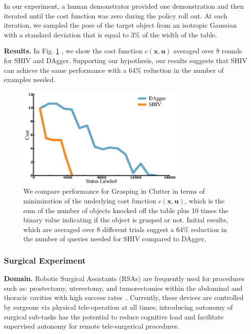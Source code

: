 \documentclass[10pt, conference]{ieeeconf}      %
\newcommand{\bu}{\mathbf{u}}
\newcommand{\bx}{\mathbf{x}}
\begin{document}
In our experiment, a human demonstrator provided one demonstration and then iterated until the cost function was zero during the policy roll out. At each iteration, we sampled the pose of the target object from an isotropic Gaussian with a standard deviation that is equal to $3\%$ of the width of the table. 

\noindent\textbf{Results.} In Fig. \ref{fig:grasp_cost} , we show the cost function $c(\bx,\bu)$ averaged over 8 rounds for SHIV and DAgger. Supporting our hypothesis, our results suggests that SHIV can achieve the same performance with a 64\% reduction in the number of examples needed.

\begin{figure}[t!]
\centering
\includegraphics[width=\columnwidth, height=2in]{figures/grasp_clutter.eps}
\caption{We compare performance for Grasping in Clutter in terms of minimization of the underlying cost function $c(\bx,\bu)$, which is the sum of the number of objects knocked off the table plus 10 times the binary value indicating if the object is grasped or not. Initial results, which are averaged over 8 different trials suggest a $64\%$ reduction in the number of queries needed for SHIV compared to DAgger,}
\vspace*{-10pt}
\label{fig:grasp_cost}
\end{figure}




\subsubsection{Surgical Experiment}

\noindent\textbf{Domain.}
Robotic Surgical Assistants (RSAs) are frequently used for procedures such as: prostectomy, uterectomy, and tumorectomies within the abdominal and thoracic cavities with high success rates~\cite{van2013laparoscopic,darzi2004impact}. Currently, these devices are controlled by surgeons via physical tele-operation at all times; introducing autonomy of surgical sub-tasks has the potential to reduce cognitive load and facilitate supervised autonomy for remote tele-surgerical procedures.
\end{document}
